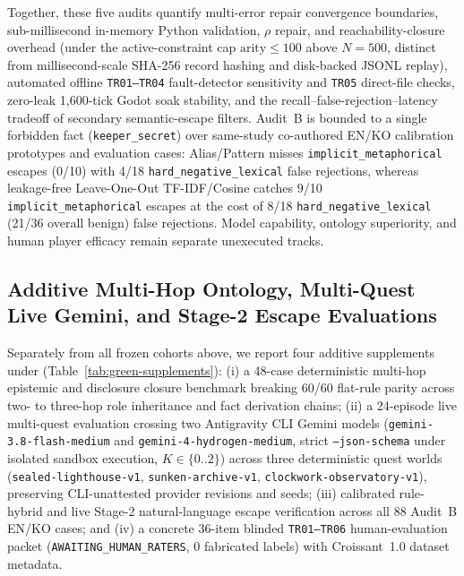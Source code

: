 \documentclass[journal]{IEEEtran}
\begin{document}
Together, these five audits quantify multi-error repair convergence boundaries, sub-millisecond in-memory Python validation, $\rho$ repair, and reachability-closure overhead (under the active-constraint cap $\text{arity}{\le}100$ above $N{=}500$, distinct from millisecond-scale SHA-256 record hashing and disk-backed JSONL replay), automated offline \texttt{TR01--TR04} fault-detector sensitivity and \texttt{TR05} direct-file checks, zero-leak 1,600-tick Godot soak stability, and the recall--false-rejection--latency tradeoff of secondary semantic-escape filters. Audit~B is bounded to a single forbidden fact (\texttt{keeper\_secret}) over same-study co-authored EN/KO calibration prototypes and evaluation cases: Alias/Pattern misses \texttt{implicit\_metaphorical} escapes (0/10) with 4/18 \texttt{hard\_negative\_lexical} false rejections, whereas leakage-free Leave-One-Out TF-IDF/Cosine catches 9/10 \texttt{implicit\_metaphorical} escapes at the cost of 8/18 \texttt{hard\_negative\_lexical} (21/36 overall benign) false rejections. Model capability, ontology superiority, and human player efficacy remain separate unexecuted tracks.

\subsection{Additive Multi-Hop Ontology, Multi-Quest Live Gemini, and Stage-2 Escape Evaluations}\label{sec:green-supplements}
Separately from all frozen cohorts above, we report four additive supplements under  (Table~\ref{tab:green-supplements}): (i) a 48-case deterministic multi-hop epistemic and disclosure closure benchmark breaking 60/60 flat-rule parity across two- to three-hop role inheritance and fact derivation chains; (ii) a 24-episode live multi-quest evaluation crossing two Antigravity CLI Gemini models (\texttt{gemini-3.8-}\allowbreak\texttt{flash-}\allowbreak\texttt{medium} and \texttt{gemini-4-}\allowbreak\texttt{hydrogen-}\allowbreak\texttt{medium}, strict \texttt{--json-schema} under isolated sandbox execution, $K{\in}\{0..2\}$) across three deterministic quest worlds (\texttt{sealed-\allowbreak lighthouse-\allowbreak v1}, \texttt{sunken-\allowbreak archive-\allowbreak v1}, \texttt{clockwork-\allowbreak observatory-\allowbreak v1}), preserving CLI-unattested provider revisions and seeds; (iii) calibrated rule-hybrid and live Stage-2 natural-language escape verification across all 88 Audit~B EN/KO cases; and (iv) a concrete 36-item blinded \texttt{TR01--TR06} human-evaluation packet (\texttt{AWAITING\_}\allowbreak\texttt{HUMAN\_}\allowbreak\texttt{RATERS}, 0 fabricated labels) with Croissant~1.0 dataset metadata.
\end{document}
